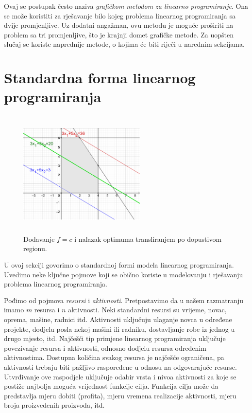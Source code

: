 \documentclass[a4paper, utf8, 11pt, colorlinks]{book}
\theoremstyle{definition}
\begin{document}
Ovaj se postupak često naziva \emph{grafičkom metodom za linearno programiranje}. Ona se može koristiti za rješavanje bilo kojeg problema linearnog programiranja sa dvije promjenljive. Uz dodatni angažman,  ovu metodu je moguće   proširiti na problem sa tri promjenljive, što je krajnji domet grafičke metode. Za uopšten slučaj se koriste naprednije metode,  o kojima će biti riječi u narednim sekcijama.

\section{Standardna forma linearnog programiranja}

\begin{figure}[!ht]
    \centering
    \includegraphics[width=180pt, height=180pt]{fig2.eps}
    \caption{Dodavanje $f = c$ i nalazak optimuma transliranjem po dopustivom regionu.}
    \label{fig:fig2}
\end{figure}

U ovoj sekciji govorimo o standardnoj formi modela linearnog programiranja. Uvedimo neke ključne pojmove koji se obično koriste u modelovanju i rješavanju problema linearnog programiranja. 

Pođimo od pojmova \textit{resursi} i \textit{aktivnosti}. Pretpostavimo da u našem razmatranju imamo $m$ resursa i $n$ aktivnosti. Neki standardni resursi su vrijeme, novac, oprema, mašine, radnici itd. Aktivnosti uključuju ulaganje novca u određene projekte, dodjelu posla nekoj mašini ili radniku,  dostavljanje robe iz jednog u drugo mjesto, itd. 
 Najčešći tip primjene linearnog programiranja uključuje povezivanje resursa i aktivnosti, odnosno dodjelu resursa određenim aktivnostima. Dostupna količina svakog resursa je najčešće ograničena, pa aktivnosti trebaju biti pažljivo raspoređene u odnosu na odgovarajuće resurse.  Utvrđivanje ove raspodjele uključuje odabir vrsta i nivoa aktivnosti za koje se postiže najbolja moguća vrijednost  funkcije cilja. Funkcija cilja može da predstavlja mjeru dobiti (profita), mjeru vremena realizacije aktivnosti, mjeru broja proizvedenih proizvoda, itd.
\end{document}
